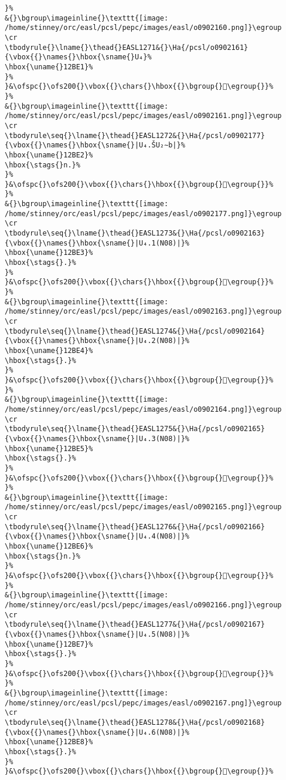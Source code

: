\begin{verbatim}
}%
&{}\bgroup\imageinline{}\texttt{[image: /home/stinney/orc/easl/pcsl/pepc/images/easl/o0902160.png]}\egroup
\cr
\tbodyrule{}\lname{}\thead{}EASL1271&{}\Ha{/pcsl/o0902161}{\vbox{{}\names{}\hbox{\sname{}U₄}%
\hbox{\uname{}12BE1}%
}%
}&\ofspc{}\ofs200{}\vbox{{}\chars{}\hbox{{}\bgroup{}𒯡\egroup{}}%
}%
&{}\bgroup\imageinline{}\texttt{[image: /home/stinney/orc/easl/pcsl/pepc/images/easl/o0902161.png]}\egroup
\cr
\tbodyrule\seq{}\lname{}\thead{}EASL1272&{}\Ha{/pcsl/o0902177}{\vbox{{}\names{}\hbox{\sname{}|U₄.ŠU₂∼b|}%
\hbox{\uname{}12BE2}%
\hbox{\stags{}n.}%
}%
}&\ofspc{}\ofs200{}\vbox{{}\chars{}\hbox{{}\bgroup{}𒯢\egroup{}}%
}%
&{}\bgroup\imageinline{}\texttt{[image: /home/stinney/orc/easl/pcsl/pepc/images/easl/o0902177.png]}\egroup
\cr
\tbodyrule\seq{}\lname{}\thead{}EASL1273&{}\Ha{/pcsl/o0902163}{\vbox{{}\names{}\hbox{\sname{}|U₄.1(N08)|}%
\hbox{\uname{}12BE3}%
\hbox{\stags{}.}%
}%
}&\ofspc{}\ofs200{}\vbox{{}\chars{}\hbox{{}\bgroup{}𒯣\egroup{}}%
}%
&{}\bgroup\imageinline{}\texttt{[image: /home/stinney/orc/easl/pcsl/pepc/images/easl/o0902163.png]}\egroup
\cr
\tbodyrule\seq{}\lname{}\thead{}EASL1274&{}\Ha{/pcsl/o0902164}{\vbox{{}\names{}\hbox{\sname{}|U₄.2(N08)|}%
\hbox{\uname{}12BE4}%
\hbox{\stags{}.}%
}%
}&\ofspc{}\ofs200{}\vbox{{}\chars{}\hbox{{}\bgroup{}𒯤\egroup{}}%
}%
&{}\bgroup\imageinline{}\texttt{[image: /home/stinney/orc/easl/pcsl/pepc/images/easl/o0902164.png]}\egroup
\cr
\tbodyrule\seq{}\lname{}\thead{}EASL1275&{}\Ha{/pcsl/o0902165}{\vbox{{}\names{}\hbox{\sname{}|U₄.3(N08)|}%
\hbox{\uname{}12BE5}%
\hbox{\stags{}.}%
}%
}&\ofspc{}\ofs200{}\vbox{{}\chars{}\hbox{{}\bgroup{}𒯥\egroup{}}%
}%
&{}\bgroup\imageinline{}\texttt{[image: /home/stinney/orc/easl/pcsl/pepc/images/easl/o0902165.png]}\egroup
\cr
\tbodyrule\seq{}\lname{}\thead{}EASL1276&{}\Ha{/pcsl/o0902166}{\vbox{{}\names{}\hbox{\sname{}|U₄.4(N08)|}%
\hbox{\uname{}12BE6}%
\hbox{\stags{}n.}%
}%
}&\ofspc{}\ofs200{}\vbox{{}\chars{}\hbox{{}\bgroup{}𒯦\egroup{}}%
}%
&{}\bgroup\imageinline{}\texttt{[image: /home/stinney/orc/easl/pcsl/pepc/images/easl/o0902166.png]}\egroup
\cr
\tbodyrule\seq{}\lname{}\thead{}EASL1277&{}\Ha{/pcsl/o0902167}{\vbox{{}\names{}\hbox{\sname{}|U₄.5(N08)|}%
\hbox{\uname{}12BE7}%
\hbox{\stags{}.}%
}%
}&\ofspc{}\ofs200{}\vbox{{}\chars{}\hbox{{}\bgroup{}𒯧\egroup{}}%
}%
&{}\bgroup\imageinline{}\texttt{[image: /home/stinney/orc/easl/pcsl/pepc/images/easl/o0902167.png]}\egroup
\cr
\tbodyrule\seq{}\lname{}\thead{}EASL1278&{}\Ha{/pcsl/o0902168}{\vbox{{}\names{}\hbox{\sname{}|U₄.6(N08)|}%
\hbox{\uname{}12BE8}%
\hbox{\stags{}.}%
}%
}&\ofspc{}\ofs200{}\vbox{{}\chars{}\hbox{{}\bgroup{}𒯨\egroup{}}%

\end{verbatim}
